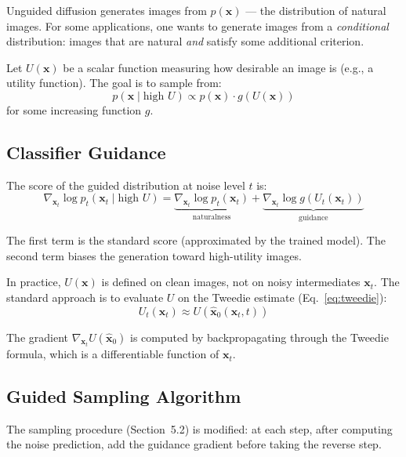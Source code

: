 \documentclass[11pt]{article}
\newcommand{\xb}{\mathbf{x}}
\begin{document}
  Unguided diffusion generates images from $p(\xb)$ --- the distribution of
  natural images. For some applications, one wants to generate images from a
  \emph{conditional} distribution: images that are natural \emph{and} satisfy
  some additional criterion.

  Let $U(\xb)$ be a scalar function measuring how desirable an image is
  (e.g., a utility function). The goal is to sample from:
  \begin{equation}
      p(\xb \mid \text{high } U) \propto p(\xb) \cdot g(U(\xb))
  \end{equation}
  for some increasing function $g$.

  \subsection{Classifier Guidance}

  The score of the guided distribution at noise level $t$ is:
  \begin{equation}
      \nabla_{\xb_t} \log p_t(\xb_t \mid \text{high } U)
      = \underbrace{\nabla_{\xb_t} \log p_t(\xb_t)}_{\text{naturalness}}
      + \underbrace{\nabla_{\xb_t} \log g(U_t(\xb_t))}_{\text{guidance}}
      \label{eq:guided_score}
  \end{equation}

  The first term is the standard score (approximated by the trained model).
  The second term biases the generation toward high-utility images.

  In practice, $U(\xb)$ is defined on clean images, not on noisy
  intermediates $\xb_t$. The standard approach is to evaluate $U$ on the
  Tweedie estimate (Eq.~\ref{eq:tweedie}):
  \begin{equation}
      U_t(\xb_t) \approx U\!\left(\hat{\xb}_0(\xb_t, t)\right)
  \end{equation}

  The gradient $\nabla_{\xb_t} U(\hat{\xb}_0)$ is computed by
  backpropagating through the Tweedie formula, which is a differentiable
  function of $\xb_t$.

  \subsection{Guided Sampling Algorithm}

  The sampling procedure (Section~5.2) is modified: at each step, after
  computing the noise prediction, add the guidance gradient before taking
  the reverse step.
\end{document}
